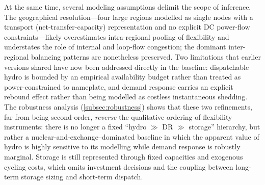 \documentclass[12pt]{article}
\begin{document}
At the same time, several modeling assumptions delimit the scope of inference. 
The geographical resolution---four large regions modelled as single nodes with a transport 
(net-transfer-capacity) representation and no explicit DC power-flow constraints---likely 
overestimates intra-regional pooling of flexibility and understates the role of internal 
and loop-flow congestion; the dominant inter-regional balancing patterns are nonetheless 
preserved. Two limitations that earlier versions shared have now been addressed directly in 
the baseline: dispatchable hydro is bounded by an empirical availability budget rather than 
treated as power-constrained to nameplate, and demand response carries an explicit rebound 
effect rather than being modelled as costless instantaneous shedding. The robustness analysis 
(\cref{subsec:robustness}) shows that these two refinements, far from being second-order, 
\emph{reverse} the qualitative ordering of flexibility instruments: there is no longer a fixed 
``hydro $\gg$ DR $\gg$ storage'' hierarchy, but rather a nuclear-and-exchange–dominated baseline 
in which the apparent value of hydro is highly sensitive to its modelling while demand response is robustly marginal. Storage is 
still represented through fixed capacities and exogenous cycling costs, which omits investment 
decisions and the coupling between long-term storage sizing and short-term dispatch.

\medskip
\end{document}
